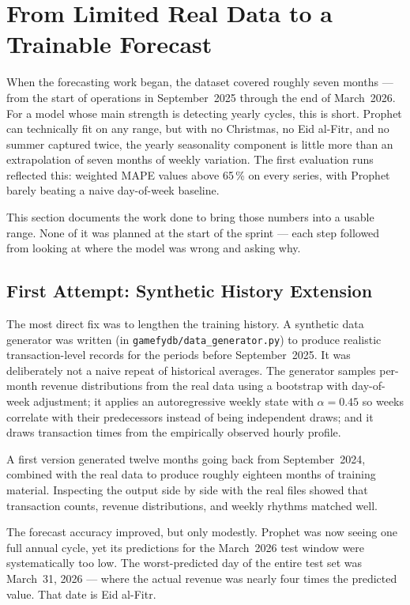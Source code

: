 \section{From Limited Real Data to a Trainable Forecast}\label{sec:data_journey}

When the forecasting work began, the dataset covered roughly seven months ---
from the start of operations in September~2025 through the end of March~2026.
For a model whose main strength is detecting yearly cycles, this is short.
Prophet can technically fit on any range, but with no Christmas, no Eid al-Fitr,
and no summer captured twice, the yearly seasonality component is little more
than an extrapolation of seven months of weekly variation. The first evaluation
runs reflected this: weighted MAPE values above 65\,\% on every series, with
Prophet barely beating a naive day-of-week baseline.

This section documents the work done to bring those numbers into a usable
range. None of it was planned at the start of the sprint --- each step
followed from looking at where the model was wrong and asking why.

\subsection{First Attempt: Synthetic History Extension}

The most direct fix was to lengthen the training history. A synthetic data
generator was written (in \texttt{gamefydb/data\_generator.py}) to produce
realistic transaction-level records for the periods before September~2025.
It was deliberately not a naive repeat of historical averages. The generator
samples per-month revenue distributions from the real data using a bootstrap
with day-of-week adjustment; it applies an autoregressive weekly state with
$\alpha=0.45$ so weeks correlate with their predecessors instead of being
independent draws; and it draws transaction times from the empirically observed
hourly profile.

A first version generated twelve months going back from September~2024,
combined with the real data to produce roughly eighteen months of training
material. Inspecting the output side by side with the real files showed that
transaction counts, revenue distributions, and weekly rhythms matched well.

The forecast accuracy improved, but only modestly. Prophet was now seeing one
full annual cycle, yet its predictions for the March~2026 test window were
systematically too low. The worst-predicted day of the entire test set was
March~31, 2026 --- where the actual revenue was nearly four times the predicted
value. That date is Eid al-Fitr.

